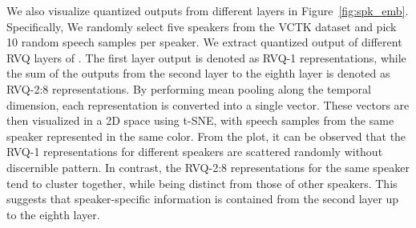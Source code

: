 We also visualize quantized outputs from different layers in Figure~\ref{fig:spk_emb}. 
Specifically, We randomly select five speakers from the VCTK dataset and pick 10 random speech samples per speaker. We extract quantized output of different RVQ layers of \method. The first layer output is denoted as RVQ-1 representations, while the sum of the outputs from the second layer to the eighth layer is denoted as RVQ-2:8 representations. By performing mean pooling along the temporal dimension, each representation is converted into a single vector. These vectors are then visualized in a 2D space using t-SNE, with speech samples from the same speaker represented in the same color.
From the plot, it can be observed that the RVQ-1 representations for different speakers are scattered randomly without discernible pattern. In contrast, the RVQ-2:8 representations for the same speaker tend to cluster together, while being distinct from those of other speakers. This suggests that speaker-specific information is contained from the second layer up to the eighth layer.





